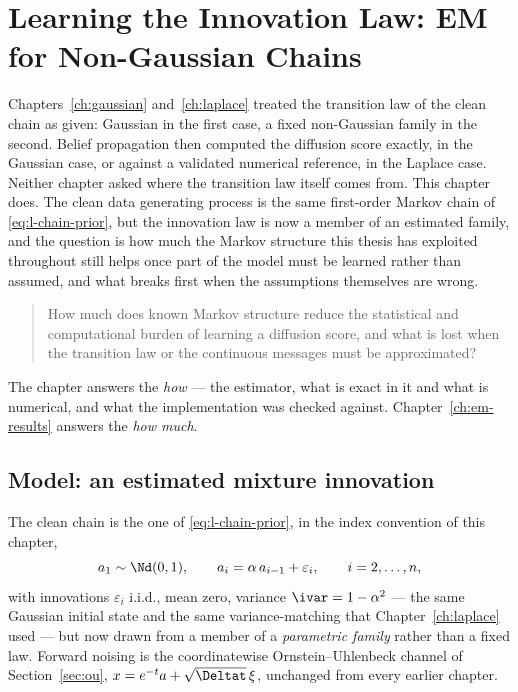 %

\chapter{Learning the Innovation Law: EM for Non-Gaussian Chains}
\label{ch:em-method}

Chapters~\ref{ch:gaussian} and~\ref{ch:laplace} treated the transition law of
the clean chain as given: Gaussian in the first case, a fixed non-Gaussian
family in the second. Belief propagation then computed the diffusion score
exactly, in the Gaussian case, or against a validated numerical reference, in
the Laplace case. Neither chapter asked where the transition law itself comes
from. This chapter does. The clean data generating process is the same
first-order Markov chain of \eqref{eq:l-chain-prior}, but the innovation law
is now a member of an estimated family, and the question is how much the
Markov structure this thesis has exploited throughout still helps once part of
the model must be learned rather than assumed, and what breaks first when the
assumptions themselves are wrong.

\begin{quote}
How much does known Markov structure reduce the statistical and computational
burden of learning a diffusion score, and what is lost when the transition law
or the continuous messages must be approximated?
\end{quote}

The chapter answers the \emph{how} --- the estimator, what is exact in it and
what is numerical, and what the implementation was checked against.
Chapter~\ref{ch:em-results} answers the \emph{how much}.

\section{Model: an estimated mixture innovation}\label{sec:em-model}

The clean chain is the one of \eqref{eq:l-chain-prior}, in the index
convention of this chapter,
\begin{equation}
  a_1 \sim \Nd(0,1), \qquad a_i = \alpha\, a_{i-1} + \varepsilon_i,
  \qquad i = 2,\dots,n,
  \label{eq:em-chain}
\end{equation}
with innovations $\varepsilon_i$ i.i.d., mean zero, variance
$\ivar = 1-\alpha^2$ --- the same Gaussian initial state and the same
variance-matching that Chapter~\ref{ch:laplace} used --- but now drawn from
a member of a \emph{parametric family} rather than a fixed law. Forward noising is the coordinatewise
Ornstein--Uhlenbeck channel of Section~\ref{sec:ou},
$x = e^{-t} a + \sqrt{\Deltat}\,\xi$, unchanged from every earlier chapter.

